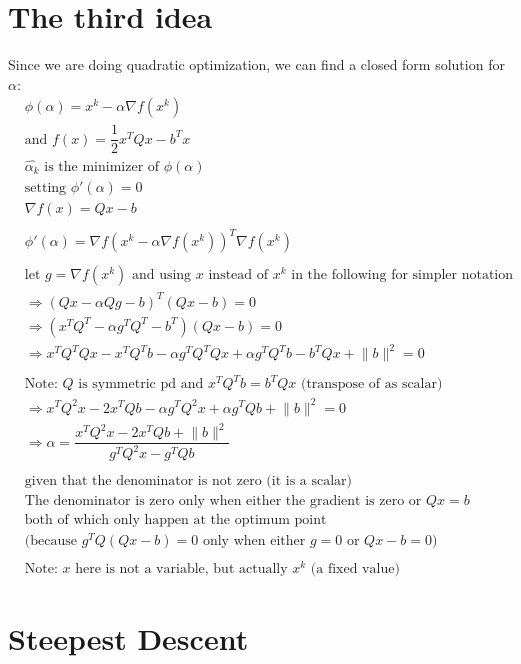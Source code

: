 \documentclass[11pt]{article}
\begin{document}
\section{The third idea}
Since we are doing quadratic optimization, we can find a closed form solution for
\(\alpha\):
\begin{align*}
    &\phi(\alpha)= x^k-\alpha\nabla f(x^k)\\
    &\mbox{and }f(x)=\dfrac{1}{2}x^TQx-b^Tx\\
    &\hat{\alpha_k}\mbox{ is the minimizer of }\phi(\alpha)\\
    &\mbox{setting }\phi'(\alpha)=0\\
    &\nabla f(x)=Qx-b\\
    &\\
    &\phi'(\alpha)=\nabla f\left(x^k-\alpha\nabla f(x^k)\right)^T\nabla f(x^k)\\
    &\\
    &\mbox{let $g=\nabla f(x^k)$ and using $x$ instead of $x^k$ in the following for
    simpler notation}\\
    &\Rightarrow \left(Qx-\alpha Qg-b\right)^T(Qx-b)=0\\
    &\Rightarrow \left(x^TQ^T-\alpha g^TQ^T -b^T\right)(Qx-b)=0\\
    &\Rightarrow x^TQ^TQx-x^TQ^Tb-\alpha g^TQ^TQx + \alpha g^TQ^Tb - b^TQx +\lVert b\rVert^2=0\\
    &\\
    &\mbox{Note: $Q$ is symmetric pd and $x^TQ^Tb=b^TQx$ (transpose of as scalar)}\\
    &\Rightarrow x^TQ^2x-2x^TQb-\alpha g^TQ^2x+\alpha g^TQb+\lVert b\rVert^2=0\\
    &\Rightarrow \alpha=\dfrac{x^TQ^2x-2x^TQb+\lVert b\rVert^2}{g^TQ^2x-g^TQb}\\
    &\\
    &\mbox{given that the denominator is not zero (it is a scalar)}\\
    &\mbox{The denominator is zero only when either the gradient is zero or $Qx=b$}\\
    &\mbox{both of which only happen at the optimum point}\\
    &\mbox{(because }g^TQ(Qx-b)=0\mbox{ only when either $g=0$ or $Qx-b=0$)}\\
    &\\
    &\mbox{Note: $x$ here is not a variable, but actually $x^k$ (a fixed value)}
\end{align*}

\section{Steepest Descent}
\end{document}
